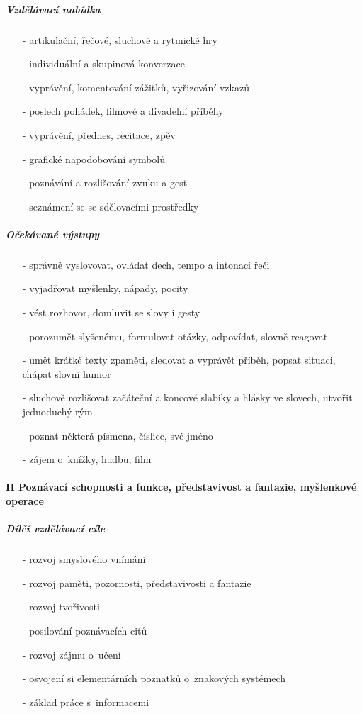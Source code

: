 					\subparagraph{Vzdělávací nabídka}

					\begin{itemize}
					\setlength\itemsep{-2mm}
						\item[-]artikulační, řečové, sluchové a rytmické hry
						\item[-]individuální a skupinová  konverzace
						\item[-]vyprávění, komentování zážitků, vyřizování vzkazů
						\item[-]poslech pohádek, filmové a divadelní příběhy
						\item[-]vyprávění, přednes, recitace, zpěv
						\item[-]grafické napodobování symbolů
						\item[-]poznávání a rozlišování zvuku a gest
						\item[-]seznámení se se sdělovacími prostředky
					\end{itemize}

					\subparagraph{Očekávané výstupy}

					\begin{itemize}
					\setlength\itemsep{-2mm}
						\item[-]správně vyslovovat, ovládat dech, tempo a intonaci řeči
						\item[-]vyjadřovat myšlenky, nápady, pocity
						\item[-]vést rozhovor, domluvit se slovy i gesty
						\item[-]porozumět slyšenému, formulovat otázky, odpovídat, slovně reagovat
						\item[-]umět krátké texty zpaměti, sledovat a vyprávět příběh, popsat situaci, chápat slovní humor
						\item[-]sluchově rozlišovat začáteční a koncové slabiky a hlásky ve slovech, utvořit jednoduchý rým
						\item[-]poznat některá písmena, číslice, své jméno
						\item[-]zájem o~knížky, hudbu, film
					\end{itemize}
				
				\paragraph{II Poznávací schopnosti a funkce, představivost a fantazie, myšlenkové operace}
				\textcolor{white}{ } 

					\subparagraph{Dílčí vzdělávací cíle}

					\begin{itemize}
					\setlength\itemsep{-2mm}
						\item[-]rozvoj smyslového vnímání
						\item[-]rozvoj paměti, pozornosti, představivosti a fantazie
						\item[-]rozvoj tvořivosti
						\item[-]posilování poznávacích citů
						\item[-]rozvoj zájmu o~učení
						\item[-]osvojení si elementárních poznatků o~znakových systémech
						\item[-]základ práce s~informacemi
					\end{itemize}
					
